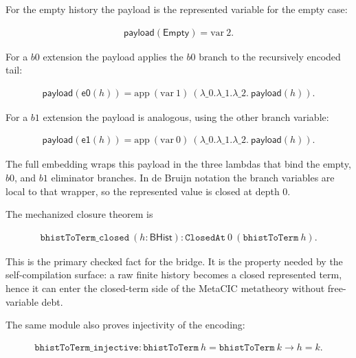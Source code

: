 For the empty history the payload is the represented variable for the empty
case:

$$
\begin{aligned}
\mathsf{payload}(\mathsf{Empty}) = \mathrm{var}\ 2 .
\end{aligned}
$$

For a $b0$ extension the payload applies the $b0$ branch to the recursively
encoded tail:

$$
\begin{aligned}
\mathsf{payload}(\mathsf{e0}(h))
  =
  \mathrm{app}\ (\mathrm{var}\ 1)\
    (\lambda\_0.\lambda\_1.\lambda\_2.\ \mathsf{payload}(h)).
\end{aligned}
$$

For a $b1$ extension the payload is analogous, using the other branch
variable:

$$
\begin{aligned}
\mathsf{payload}(\mathsf{e1}(h))
  =
  \mathrm{app}\ (\mathrm{var}\ 0)\
    (\lambda\_0.\lambda\_1.\lambda\_2.\ \mathsf{payload}(h)).
\end{aligned}
$$

The full embedding wraps this payload in the three lambdas that bind the
empty, $b0$, and $b1$ eliminator branches. In de Bruijn notation the branch
variables are local to that wrapper, so the represented value is closed at
depth $0$.

The mechanized closure theorem is

$$
\begin{aligned}
\texttt{bhistToTerm\_closed}\ (h : \mathsf{BHist}) :
  \texttt{ClosedAt}\ 0\
    (\texttt{bhistToTerm}\ h).
\end{aligned}
$$


This is the primary checked fact for the bridge. It is the property needed by
the self-compilation surface: a raw finite history becomes a closed
represented term, hence it can enter the closed-term side of the MetaCIC
metatheory without free-variable debt.

The same module also proves injectivity of the encoding:

$$
\begin{aligned}
\texttt{bhistToTerm\_injective} :
  \texttt{bhistToTerm}\ h =
  \texttt{bhistToTerm}\ k \to h = k .
\end{aligned}
$$


